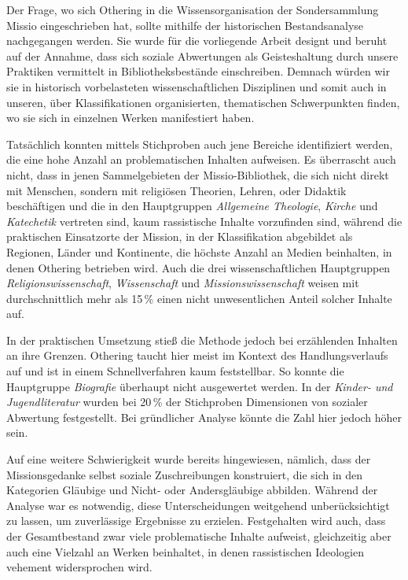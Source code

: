 \documentclass[a4paper,
fontsize=11pt,
oneside,
numbers=noperiodatend,
parskip=half-,
bibliography=totoc,
final
]{scrartcl}
\begin{document}
Der Frage, wo sich Othering in die Wissensorganisation der
Sondersammlung Missio eingeschrieben hat, sollte mithilfe der
historischen Bestandsanalyse nachgegangen werden. Sie wurde für die
vorliegende Arbeit designt und beruht auf der Annahme, dass sich soziale
Abwertungen als Geisteshaltung durch unsere Praktiken vermittelt in
Bibliotheksbestände einschreiben. Demnach würden wir sie in historisch
vorbelasteten wissenschaftlichen Disziplinen und somit auch in unseren,
über Klassifikationen organisierten, thematischen Schwerpunkten finden,
wo sie sich in einzelnen Werken manifestiert haben.

Tatsächlich konnten mittels Stichproben auch jene Bereiche identifiziert
werden, die eine hohe Anzahl an problematischen Inhalten aufweisen. Es
überrascht auch nicht, dass in jenen Sammelgebieten der
Missio-Bibliothek, die sich nicht direkt mit Menschen, sondern mit
religiösen Theorien, Lehren, oder Didaktik beschäftigen und die in den
Hauptgruppen \emph{Allgemeine Theologie}, \emph{Kirche} und
\emph{Katechetik} vertreten sind, kaum rassistische Inhalte vorzufinden
sind, während die praktischen Einsatzorte der Mission, in der
Klassifikation abgebildet als Regionen, Länder und Kontinente, die
höchste Anzahl an Medien beinhalten, in denen Othering betrieben wird.
Auch die drei wissenschaftlichen Hauptgruppen
\emph{Religionswissenschaft}, \emph{Wissenschaft} und
\emph{Missionswissenschaft} weisen mit durchschnittlich mehr als 15\,\%
einen nicht unwesentlichen Anteil solcher Inhalte auf.

In der praktischen Umsetzung stieß die Methode jedoch bei erzählenden
Inhalten an ihre Grenzen. Othering taucht hier meist im Kontext des
Handlungsverlaufs auf und ist in einem Schnellverfahren kaum
feststellbar. So konnte die Hauptgruppe \emph{Biografie} überhaupt nicht
ausgewertet werden. In der \emph{Kinder- und Jugendliteratur} wurden bei
20\,\% der Stichproben Dimensionen von sozialer Abwertung festgestellt.
Bei gründlicher Analyse könnte die Zahl hier jedoch höher sein.

Auf eine weitere Schwierigkeit wurde bereits hingewiesen, nämlich, dass
der Missionsgedanke selbst soziale Zuschreibungen konstruiert, die sich
in den Kategorien Gläubige und Nicht- oder Andersgläubige abbilden.
Während der Analyse war es notwendig, diese Unterscheidungen weitgehend
unberücksichtigt zu lassen, um zuverlässige Ergebnisse zu erzielen.
Festgehalten wird auch, dass der Gesamtbestand zwar viele problematische
Inhalte aufweist, gleichzeitig aber auch eine Vielzahl an Werken
beinhaltet, in denen rassistischen Ideologien vehement widersprochen
wird.
\end{document}
